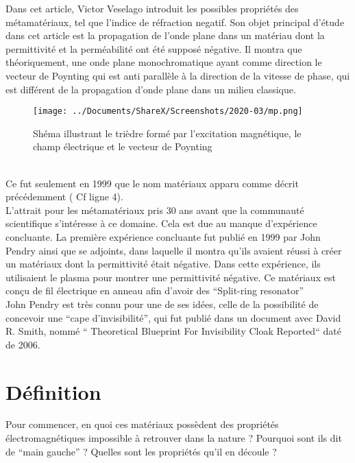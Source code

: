 \documentclass[12pt,a4paper]{article}
\begin{document}
	Dans cet article, Victor Veselago introduit les possibles propriétés des métamatériaux, tel que l’indice de réfraction negatif. Son objet principal d’étude dans cet article est la propagation de l’onde plane dans un matériau dont la permittivité et la perméabilité ont été supposé négative. Il montra que théoriquement, une onde plane monochromatique ayant comme direction le vecteur de Poynting qui est anti parallèle à la direction de la vitesse de phase, qui est différent de la propagation d’onde plane dans un milieu classique.
\begin{figure}[hbtp]
	\centering
	\texttt{[image: ../Documents/ShareX/Screenshots/2020-03/mp.png]}
	\caption{Shéma illustrant le trièdre formé par l'excitation magnétique, le champ électrique et le vecteur de Poynting}
	\end{figure} \\ 
	Ce fut seulement en 1999 que le nom matériaux apparu comme décrit précédemment ( Cf ligne 4).\\
	
	L’attrait pour les métamatériaux pris 30 ans avant que la communauté scientifique s'intéresse à ce domaine. Cela est due au manque d’expérience concluante.
La première expérience concluante fut publié en 1999 par John Pendry ainsi que se adjoints, dans laquelle il montra qu’ils avaient réussi à créer un matériaux dont la permittivité était négative. Dans cette expérience, ils utilisaient le plasma pour montrer une permittivité négative. Ce matériaux est conçu de fil électrique en anneau afin d’avoir des “Split-ring resonator”\\

	John Pendry est très connu pour une de ses idées, celle de la possibilité de concevoir une “cape d’invisibilité”, qui fut publié dans un document avec David R. Smith, nommé “ Theoretical Blueprint For Invisibility Cloak Reported“\cite{Duke} daté de 2006.

\section{Définition}
	Pour commencer, en quoi ces matériaux possèdent des propriétés électromagnétiques impossible à retrouver dans la nature ? Pourquoi sont ils dit de “main gauche” ? Quelles sont les propriétés qu’il en découle ?\\
\end{document}
